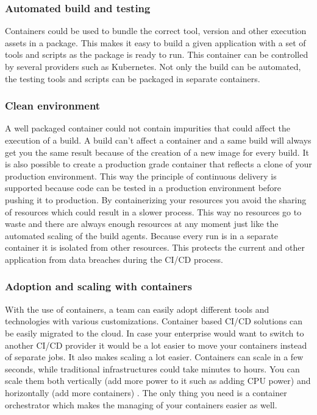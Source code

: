 \subsubsection{Automated build and testing}
Containers could be used to bundle the correct tool, version and other execution assets in a package. This makes it easy to build a given application with a set of tools and scripts as the package is ready to run. This container can be controlled by several providers such as Kubernetes.
Not only the build can be automated, the testing tools and scripts can be packaged in separate containers.

\subsubsection{Clean environment}
A well packaged container could not contain impurities that could affect the execution of a build. A build can’t affect a container and a same build will always get you the same result because of the creation of a new image for every build. 
It is also possible to create a production grade container that reflects a clone of your production environment. This way the principle of continuous delivery is supported because code can be tested in a production environment before pushing it to production.
By containerizing your resources you avoid the sharing of resources which could result in a slower process. This way no resources go to waste and there are always enough resources at any moment just like the automated scaling of the build agents. Because every run is in a separate container it is isolated from other resources. This protects the current and other application from data breaches during the CI/CD process.

\subsubsection{Adoption and scaling with containers}
With the use of containers, a team can easily adopt different tools and technologies with various customizations. Container based CI/CD solutions can be easily migrated to the cloud. In case your enterprise would want to switch to another CI/CD provider it would be a lot easier to move your containers instead of separate jobs. 
It also makes scaling a lot easier. Containers can scale in a few seconds, while traditional infrastructures could take minutes to hours. You can scale them both vertically (add more power to it such as adding CPU power) and horizontally (add more containers) \autocite{Samant2021}. The only thing you need is a container orchestrator which makes the managing of your containers easier as well.


